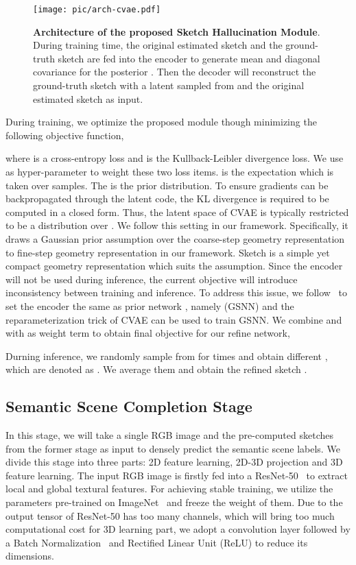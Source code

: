 \documentclass[10pt,twocolumn,letterpaper]{article}
\begin{document}
\begin{figure}[ht]
\centering
\texttt{[image: pic/arch-cvae.pdf]}
\caption{\small{\textbf{Architecture of the proposed Sketch Hallucination Module}. During training time, the original estimated sketch and the ground-truth sketch are fed into the encoder to generate mean and diagonal covariance for the posterior . Then the decoder will reconstruct the ground-truth sketch with a latent sampled from  and the original estimated sketch as input.}}
\vspace{-2mm}
\label{fig:arch-cvae}
\end{figure}



During training, we optimize the proposed module though minimizing the following objective function,

where  is a cross-entropy loss and  is the Kullback-Leibler divergence loss.  We use  as hyper-parameter to weight these two loss items.  is the expectation which is taken over  samples. The  is the prior distribution. To ensure gradients can be backpropagated through the latent code, the KL divergence is required to be computed in a closed form. Thus, the latent space of CVAE is typically restricted to be a distribution over . We follow this setting in our framework. Specifically, it draws a Gaussian prior assumption over the coarse-step geometry representation to fine-step geometry representation in our framework. Sketch is a simple yet compact geometry representation which suits the assumption. Since the encoder will not be used during inference, the current objective will introduce inconsistency between training and inference. To address this issue, we follow~\cite{sohn2015learning,sharma2019monocular} to set the encoder the same as prior network , namely  (GSNN) and the reparameterization trick of CVAE can be used to train GSNN. We combine  and  with  as weight term to obtain final objective for our refine network,


Durning inference, we randomly sample  from  for  times and obtain  different , which are denoted as . We average them and obtain the refined sketch .

\subsection{Semantic Scene Completion Stage}

In this stage, we will take a single RGB image and the pre-computed sketches from the former stage as input to densely predict the semantic scene labels. We divide this stage into three parts: 2D feature learning, 2D-3D projection and 3D feature learning. The input RGB image is firstly fed into a ResNet-50~\cite{he2016deep} to extract local and global textural features. For achieving stable training, we utilize the parameters pre-trained on ImageNet~\cite{deng2009imagenet} and freeze the weight of them. Due to the output tensor of ResNet-50 has too many channels, which will bring too much computational cost for 3D learning part, we adopt a convolution layer followed by a Batch Normalization~\cite{ioffe2015batch} and Rectified Linear Unit (ReLU) to reduce its dimensions.
\end{document}
